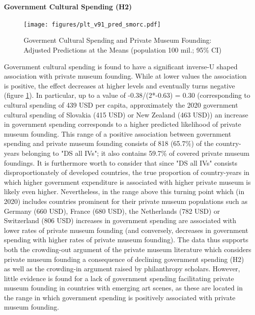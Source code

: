 \documentclass[11pt]{article}
\begin{document}
\paragraph*{Government Cultural Spending (H2)}

\begin{figure}[htbp]
\centering
\texttt{[image: figures/plt\_v91\_pred\_smorc.pdf]}
\caption{\label{fig:pred_smorc}Goverment Cultural Spending and Private Museum Founding: Adjusted Predictions at the Means (population 100 mil.; 95\% CI)}
\end{figure}

Government cultural spending is found to have a significant inverse-U shaped association with private museum founding.
While at lower values the association is positive, the effect decreases at higher levels and eventually turns negative (figure \ref{fig:pred_smorc}).
In particular, up to a value of -0.38/(2*-0.63) = 0.30 (corresponding to cultural spending of 439 USD per capita, approximately the 2020 government cultural spending of Slovakia (415 USD) or New Zealand (463 USD)) an increase in government spending corresponds to a higher predicted likelihood of private museum founding. 
This range of a positive association between government spending and private museum founding consists of 818 (65.7\%) of the country-years belonging to "DS all IVs"; it also contains 59.7\% of covered private museum foundings.
It is furthermore worth to consider that since "DS all IVs" consists disproportionately of developed countries, the true proportion of country-years in which higher government expenditure is associated with higher private museum is likely even higher.
Nevertheless, in the range above this turning point which (in 2020) includes countries prominent for their private museum populations such as Germany (660 USD), France (680 USD), the Netherlands (782 USD) or Switzerland (806 USD) increases in government spending are associated with lower rates of private museum founding (and conversely, decreases in government spending with higher rates of private museum founding).
The data thus supports both the crowding-out argument of the private museum literature which considers private museum founding  a consequence of declining government spending (H2) as well as the crowding-in argument raised by philanthropy scholars. 
However, little evidence is found for a lack of government spending facilitating private museum founding in countries  with emerging art scenes, as these are located in the range in which government spending is positively associated with private museum founding. 
\end{document}
